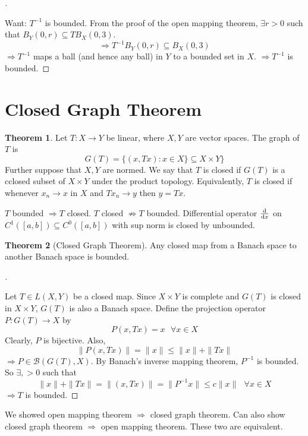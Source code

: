 \documentclass{article}
\newcommand{\sfa}{\text{  } \forall}
\theoremstyle{definition}
\newtheorem{thm}{Theorem}
\newenvironment{proofs}[1][\proofname]{%
  \begin{proof}[#1]$ $\par\nobreak\ignorespaces
}{%
  \end{proof}
}
\begin{document}
\begin{proofs}
	Want: $T^{-1}$ is bounded.
	From the proof of the open mapping theorem, $\exists r > 0$ such that $B_Y(0, r) \subseteq T B_X(0, 3)$.
	\[
		\Rightarrow T^{-1} B_Y(0, r) \subseteq B_X(0, 3)
	\]
	$\Rightarrow T^{-1}$ maps a ball (and hence any ball) in $Y$ to a bounded set in $X$.
	$\Rightarrow T^{-1}$ is bounded.
\end{proofs}

\section{Closed Graph Theorem}

\begin{thm}
	Let $T: X \to Y$ be linear, where $X, Y$ are vector spaces.
	The graph of $T$ is 
	\[
		G(T) = \{ (x, Tx) : x \in X \} \subseteq X \times Y\}
	\]
	Further suppose that $X, Y$ are normed.
	We say that $T$ is closed if $G(T)$ is a cclosed subset of $X \times Y$ under the product topology.
	Equivalently, $T$ is closed if whenever $x_n \to x$ in $X$ and $T x_n \to y$ then $y = T x$.
\end{thm}

$T$ bounded $\Rightarrow T$ closed. 
$T$ closed $\not\Rightarrow T$ bounded.
Differential operator $\dv{x}$ on $C^1([a, b]) \subseteq C^0([a, b])$ with sup norm is closed by unbounded.

\begin{thm}[Closed Graph Theorem]
	Any closed map from a Banach space to another Banach space is bounded.
\end{thm}

\begin{proofs}
	Let $T \in L(X, Y)$ be a closed map.
	Since $X \times Y$ is complete and $G(T)$ is closed in $X \times Y$, $G(T)$ is also a Banach space.
	Define the projection operator $P: G(T) \to X$ by 
	\[
		P(x, T x) = x \sfa x \in X
	\]
	Clearly, $P$ is bijective.
	Also, 
	\[
		\|P(x, Tx)\| = \|x\| \leq \|x\| + \|T x\|
	\]
	$\Rightarrow P \in \mathcal{B}(G(T), X)$.
	By Banach's inverse mapping theorem, $P^{-1}$ is bounded.
	So $\exists , > 0$ such that 
	\[
		\|x\| + \|T x \| = \|(x, T x) \| = \| P^{-1} x\| \leq c \|x\| \sfa x \in X
	\]
	$\Rightarrow T$ is bounded.
\end{proofs}

We showed open mapping theorem $\Rightarrow$ closed graph theorem. 
Can also show closed graph theorem $\Rightarrow$ open mapping theorem.
These two are equivalent.
\end{document}

